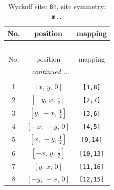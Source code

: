 \documentclass[fleqn,8pt]{jsarticle}
\begin{document}
\begin{longtable}{ccc}
\caption{Wyckoff site: {\tt 8n}, site symmetry: {\tt m..}}
 \\
 \hline \hline
No. & position & mapping \\ \hline \endfirsthead

\multicolumn{2}{l}{\tablename\ \thetable{}} \\
 \hline \hline
No. & position & mapping \\ \hline \endhead

 \hline \hline
\multicolumn{2}{r}{\footnotesize\it continued ...} \\ \endfoot

 \hline \hline
\multicolumn{2}{r}{} \\ \endlastfoot

1 & $\left[ x,\, y,\, 0 \right]$ & {\tt [1,8]} \\ \hline
2 & $\left[ - y,\, x,\, \frac{1}{2} \right]$ & {\tt [2,7]} \\ \hline
3 & $\left[ y,\, - x,\, \frac{1}{2} \right]$ & {\tt [3,6]} \\ \hline
4 & $\left[ - x,\, - y,\, 0 \right]$ & {\tt [4,5]} \\ \hline
5 & $\left[ x,\, - y,\, \frac{1}{2} \right]$ & {\tt [9,14]} \\ \hline
6 & $\left[ - x,\, y,\, \frac{1}{2} \right]$ & {\tt [10,13]} \\ \hline
7 & $\left[ y,\, x,\, 0 \right]$ & {\tt [11,16]} \\ \hline
8 & $\left[ - y,\, - x,\, 0 \right]$ & {\tt [12,15]} \\
\end{longtable}
\renewcommand{\arraystretch}{1.2}
\end{document}
